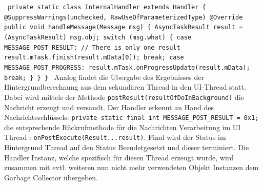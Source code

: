 \documentclass[12pt,oneside,a4paper,bibtotoc,liststotoc]{scrreprt}
\begin{document}
\texttt{\newline
private static class InternalHandler extends Handler \{\newline
\newline
@SuppressWarnings({\grqq unchecked\grqq, \grqq RawUseOfParameterizedType\grqq})\newline
@Override\newline
public void handleMessage(Message msg) \{\newline
AsyncTaskResult result = (AsyncTaskResult) msg.obj;\newline\newline
switch (msg.what) \{\newline
case MESSAGE\_POST\_RESULT:\newline
// There is only one result\newline
result.mTask.finish(result.mData[0]);\newline
break;\newline
case MESSAGE\_POST\_PROGRESS:\newline
result.mTask.onProgressUpdate(result.mData);\newline
break;\newline
\}\newline
\}\newline
\}\newline
}\newline
Analog findet die Übergabe des Ergebnisses der Hintergrundberechnung aus dem sekundären Thread in den UI-Thread statt. Dabei wird mittels der Methode \texttt{postResult(resultOfDoInBackground)} die Nachricht erzeugt und versandt. Der Handler erkennt an Hand des Nachrichteschlüssels:\newline
\texttt{private static final int MESSAGE\_POST\_RESULT = 0x1;}\newline
die entsprechende Rückrufmethode für die Nachrichten Verarbeitung im UI Thread :\newline
\texttt{onPostExecute(Result...result)}.\newline
Final wird der Status im Hintergrund Thread auf den Status \glqq Beendet\grqq gesetzt und dieser terminiert. Die Handler Instanz, welche spezifisch für diesen Thread erzeugt wurde, wird zusammen mit evtl. weiteren nun nicht mehr verwendeten Objekt Instanzen dem Garbage Collector übergeben.
\end{document}
